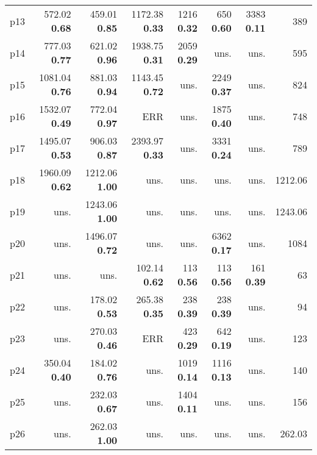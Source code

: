 \begin{tabular}{|l|rrrrrr|r|}
p13 & {\footnotesize 572.02} \textbf{0.68} & {\footnotesize 459.01} \textbf{0.85} & {\footnotesize 1172.38} \textbf{0.33} & {\footnotesize 1216} \textbf{0.32} & {\footnotesize 650} \textbf{0.60} & {\footnotesize 3383} \textbf{0.11} & 389\\
p14 & {\footnotesize 777.03} \textbf{0.77} & {\footnotesize 621.02} \textbf{0.96} & {\footnotesize 1938.75} \textbf{0.31} & {\footnotesize 2059} \textbf{0.29} & uns. & uns. & 595\\
p15 & {\footnotesize 1081.04} \textbf{0.76} & {\footnotesize 881.03} \textbf{0.94} & {\footnotesize 1143.45} \textbf{0.72} & uns. & {\footnotesize 2249} \textbf{0.37} & uns. & 824\\
p16 & {\footnotesize 1532.07} \textbf{0.49} & {\footnotesize 772.04} \textbf{0.97} & ERR & uns. & {\footnotesize 1875} \textbf{0.40} & uns. & 748\\
p17 & {\footnotesize 1495.07} \textbf{0.53} & {\footnotesize 906.03} \textbf{0.87} & {\footnotesize 2393.97} \textbf{0.33} & uns. & {\footnotesize 3331} \textbf{0.24} & uns. & 789\\
p18 & {\footnotesize 1960.09} \textbf{0.62} & {\footnotesize 1212.06} \textbf{1.00} & uns. & uns. & uns. & uns. & 1212.06\\
p19 & uns. & {\footnotesize 1243.06} \textbf{1.00} & uns. & uns. & uns. & uns. & 1243.06\\
p20 & uns. & {\footnotesize 1496.07} \textbf{0.72} & uns. & uns. & {\footnotesize 6362} \textbf{0.17} & uns. & 1084\\
p21 & uns. & uns. & {\footnotesize 102.14} \textbf{0.62} & {\footnotesize 113} \textbf{0.56} & {\footnotesize 113} \textbf{0.56} & {\footnotesize 161} \textbf{0.39} & 63\\
p22 & uns. & {\footnotesize 178.02} \textbf{0.53} & {\footnotesize 265.38} \textbf{0.35} & {\footnotesize 238} \textbf{0.39} & {\footnotesize 238} \textbf{0.39} & uns. & 94\\
p23 & uns. & {\footnotesize 270.03} \textbf{0.46} & ERR & {\footnotesize 423} \textbf{0.29} & {\footnotesize 642} \textbf{0.19} & uns. & 123\\
p24 & {\footnotesize 350.04} \textbf{0.40} & {\footnotesize 184.02} \textbf{0.76} & uns. & {\footnotesize 1019} \textbf{0.14} & {\footnotesize 1116} \textbf{0.13} & uns. & 140\\
p25 & uns. & {\footnotesize 232.03} \textbf{0.67} & uns. & {\footnotesize 1404} \textbf{0.11} & uns. & uns. & 156\\
p26 & uns. & {\footnotesize 262.03} \textbf{1.00} & uns. & uns. & uns. & uns. & 262.03\\

\end{tabular}

